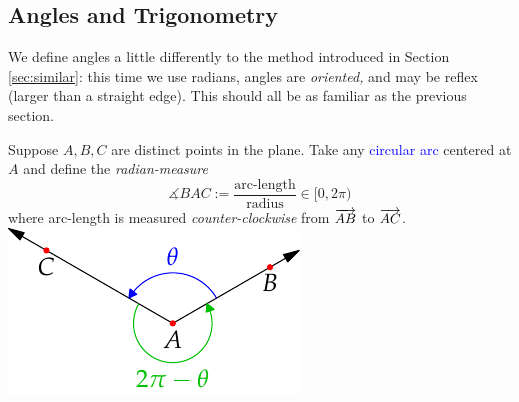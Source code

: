 \clearpage


\subsection{Angles and Trigonometry}\label{sec:analyticangle}

We define angles a little differently to the method introduced in Section \ref{sec:similar}: this time we use radians, angles are \emph{oriented,} and may be reflex (larger than a straight edge). This should all be as familiar as the previous section.

\begin{defn}[lower separated=false, sidebyside, sidebyside align=top seam, sidebyside gap=0pt, righthand width=0.32\linewidth]{}{}
Suppose $A,B,C$ are distinct points in the plane. Take any \textcolor{blue}{circular arc} centered at $A$ and define the \emph{radian-measure}
\[\measuredangle BAC:=\frac{\text{arc-length}}{\text{radius}} \in[0,2\pi)\]
where arc-length is measured \emph{counter-clockwise\footnotemark} from $\overrightarrow{AB}$ to $\overrightarrow{AC}$.
\tcblower
\flushright\includegraphics{angles-example}
\end{defn}



